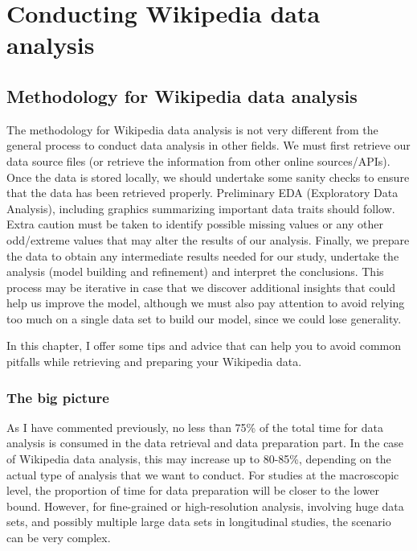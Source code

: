 \part{Conducting Wikipedia data analysis}


\chapter{Methodology for Wikipedia data analysis}
\label{chap:methodology}

The methodology for Wikipedia data analysis is not very different from the general
process to conduct data analysis in other fields. We must first retrieve our data
source files (or retrieve the information from other online sources/APIs). Once the
data is stored locally, we should undertake some sanity checks to ensure that the
data has been retrieved properly. Preliminary EDA (Exploratory Data Analysis), including
graphics summarizing important data traits should follow. Extra caution must be taken
to identify possible missing values or any other odd/extreme values that may alter
the results of our analysis. Finally, we prepare the data to obtain any intermediate
results needed for our study, undertake the analysis (model building and refinement)
and interpret the conclusions. This process may be iterative in case that we discover
additional insights that could help us improve the model, although we must also
pay attention to avoid relying too much on a single data set to build our model,
since we could lose generality.

In this chapter, I offer some tips and advice that can help you to avoid common
pitfalls while retrieving and preparing your Wikipedia data.

\section{The big picture}
As I have commented previously, no less than 75\% of the total time for data
analysis is consumed in the data retrieval and data preparation part. In the case
of Wikipedia data analysis, this may increase up to 80-85\%, depending on the actual
type of analysis that we want to conduct. For studies at the macroscopic level, the proportion
of time for data preparation will be closer to the lower bound. However, for fine-grained
or high-resolution analysis, involving huge data sets, and possibly multiple large
data sets in longitudinal studies, the scenario can be very complex.

